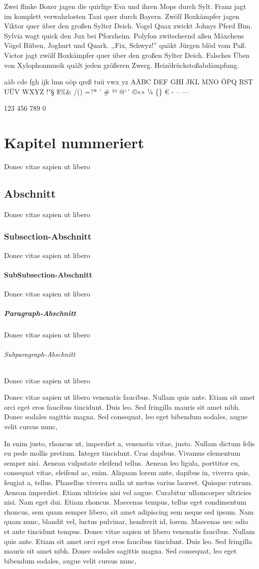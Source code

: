 \documentclass[english,ngerman]{book}%
\makeatletter
\theoremstyle{dgdef}
\theoremstyle{dgthm}
\newcommand{\kurzerblindtext}{%
\noindent{}Zwei flinke Boxer jagen die quirlige Eva und ihren Mops durch Sylt. Franz jagt im komplett verwahrlosten Taxi quer durch
  Bayern. Zwölf Boxkämpfer jagen Viktor quer über den großen Sylter Deich. Vogel Quax zwickt Johnys Pferd Bim. Sylvia wagt quick
  den Jux bei Pforzheim. Polyfon zwitschernd aßen Mäxchens Vögel Rüben, Joghurt und Quark. ,,Fix, Schwyz!'' quäkt Jürgen blöd vom
  Paß. Victor jagt zwölf Boxkämpfer quer über den großen Sylter Deich. Falsches Üben von Xylophonmusik quält jeden größeren
  Zwerg. Heizölrückstoßabdämpfung.

  aäb cde fgh ijk lmn oöp qrsß tuü vwx yz AÄBC DEF GHI JKL MNO ÖPQ RST UÜV WXYZ !"§ \$\%\& /() =?* ' \# \symbol{"7E} ²³ @`´ ©«» ¼ \{\} €  - -- ---

  123 456 789 0
}
\makeatother
\begin{document}
\kurzerblindtext




\chapter{Kapitel nummeriert}
Donec vitae sapien ut libero

\section{Abschnitt}
Donec vitae sapien ut libero

\subsection{Subsection-Abschnitt}
Donec vitae sapien ut libero

\subsubsection{SubSubsection-Abschnitt}
Donec vitae sapien ut libero

\paragraph{Paragraph-Abschnitt}
Donec vitae sapien ut libero

\subparagraph{Subparagraph-Abschnitt}
Donec vitae sapien ut libero

Donec vitae sapien ut libero venenatis faucibus. Nullam quis ante. Etiam sit amet orci eget eros faucibus tincidunt. Duis leo. Sed fringilla mauris sit amet nibh. Donec sodales sagittis magna. Sed consequat, leo eget bibendum sodales, augue velit cursus nunc,



In enim justo, rhoncus ut, imperdiet a, venenatis vitae, justo. Nullam dictum felis eu pede mollis pretium. Integer tincidunt. Cras dapibus. Vivamus elementum semper nisi. Aenean vulputate eleifend tellus. Aenean leo ligula, porttitor eu, consequat vitae, eleifend ac, enim. Aliquam lorem ante, dapibus in, viverra quis, feugiat a, tellus. Phasellus viverra nulla ut metus varius laoreet. Quisque rutrum. Aenean imperdiet. Etiam ultricies nisi vel augue. Curabitur ullamcorper ultricies nisi. Nam eget dui. Etiam rhoncus. Maecenas tempus, tellus eget condimentum rhoncus, sem quam semper libero, sit amet adipiscing sem neque sed ipsum. Nam quam nunc, blandit vel, luctus pulvinar, hendrerit id, lorem. Maecenas nec odio et ante tincidunt tempus. Donec vitae sapien ut libero venenatis faucibus. Nullam quis ante. Etiam sit amet orci eget eros faucibus tincidunt. Duis leo. Sed fringilla mauris sit amet nibh. Donec sodales sagittis magna. Sed consequat, leo eget bibendum sodales, augue velit cursus nunc,
\end{document}
